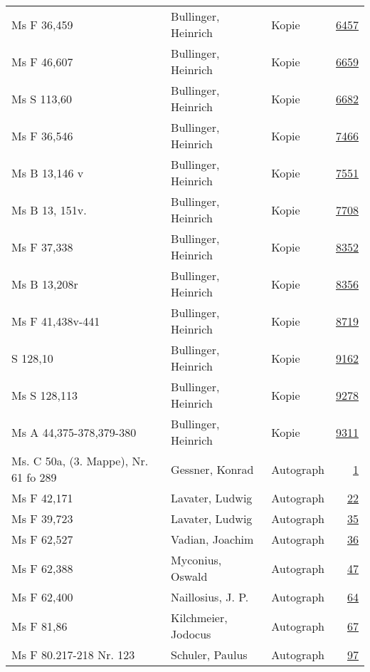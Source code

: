 \documentclass[10pt,a4paper,landscape]{report}
\begin{document}
\begin{longtable}{p{16cm}p{4cm}lr}
Ms F 36,459	&	Bullinger, Heinrich	&	Kopie	&	\href{http://130.60.24.72/assignment/6457}{6457}\\
Ms F 46,607	&	Bullinger, Heinrich	&	Kopie	&	\href{http://130.60.24.72/assignment/6659}{6659}\\
Ms S 113,60	&	Bullinger, Heinrich	&	Kopie	&	\href{http://130.60.24.72/assignment/6682}{6682}\\
Ms F 36,546	&	Bullinger, Heinrich	&	Kopie	&	\href{http://130.60.24.72/assignment/7466}{7466}\\
Ms B 13,146 v	&	Bullinger, Heinrich	&	Kopie	&	\href{http://130.60.24.72/assignment/7551}{7551}\\
Ms B 13, 151v.	&	Bullinger, Heinrich	&	Kopie	&	\href{http://130.60.24.72/assignment/7708}{7708}\\
Ms F 37,338	&	Bullinger, Heinrich	&	Kopie	&	\href{http://130.60.24.72/assignment/8352}{8352}\\
Ms B 13,208r	&	Bullinger, Heinrich	&	Kopie	&	\href{http://130.60.24.72/assignment/8356}{8356}\\
Ms F 41,438v-441	&	Bullinger, Heinrich	&	Kopie	&	\href{http://130.60.24.72/assignment/8719}{8719}\\
S 128,10	&	Bullinger, Heinrich	&	Kopie	&	\href{http://130.60.24.72/assignment/9162}{9162}\\
Ms S 128,113	&	Bullinger, Heinrich	&	Kopie	&	\href{http://130.60.24.72/assignment/9278}{9278}\\
Ms A 44,375-378,379-380	&	Bullinger, Heinrich	&	Kopie	&	\href{http://130.60.24.72/assignment/9311}{9311}\\
Ms. C 50a, (3. Mappe), Nr. 61 fo 289	&	Gessner, Konrad	&	Autograph	&	\href{http://130.60.24.72/assignment/1}{1}\\
Ms F 42,171	&	Lavater, Ludwig	&	Autograph	&	\href{http://130.60.24.72/assignment/22}{22}\\
Ms F 39,723	&	Lavater, Ludwig	&	Autograph	&	\href{http://130.60.24.72/assignment/35}{35}\\
Ms F 62,527	&	Vadian, Joachim	&	Autograph	&	\href{http://130.60.24.72/assignment/36}{36}\\
Ms F 62,388	&	Myconius, Oswald	&	Autograph	&	\href{http://130.60.24.72/assignment/47}{47}\\
Ms F 62,400	&	Naillosius, J. P.	&	Autograph	&	\href{http://130.60.24.72/assignment/64}{64}\\
Ms F 81,86	&	Kilchmeier, Jodocus	&	Autograph	&	\href{http://130.60.24.72/assignment/67}{67}\\
Ms F 80.217-218 Nr. 123	&	Schuler, Paulus	&	Autograph	&	\href{http://130.60.24.72/assignment/97}{97}\\

\end{longtable}
\end{document}
